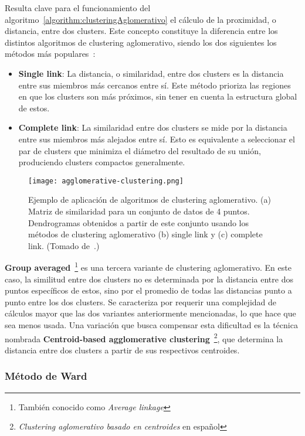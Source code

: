 Resulta clave para el funcionamiento del algoritmo~\ref{algorithm:clusteringAglomerativo} el cálculo de la proximidad, o distancia, entre dos clusters.
Este concepto constituye la diferencia entre los distintos algoritmos de clustering aglomerativo, siendo los dos siguientes los métodos más populares~\cite{Aggarawal13}:

\begin{itemize}
    \item \textbf{Single link}: La distancia, o similaridad, entre dos clusters es la distancia entre sus miembros más cercanos entre sí.
    Este método prioriza las regiones en que los clusters son más próximos, sin tener en cuenta la estructura global de estos.
    \item \textbf{Complete link}: La similaridad entre dos clusters se mide por la distancia entre sus miembros más alejados entre sí.
    Esto es equivalente a seleccionar el par de clusters que minimiza el diámetro del resultado de su unión, produciendo clusters compactos generalmente.
\end{itemize}

\begin{figure}[!h]
    \centering
    \texttt{[image: agglomerative-clustering.png]}
    \caption{Ejemplo de aplicación de algoritmos de clustering aglomerativo. (a) Matriz de similaridad para un conjunto de datos de 4 puntos.
    Dendrogramas obtenidos a partir de este conjunto usando los métodos de clustering aglomerativo (b) single link y (c) complete link. (Tomado de~\cite{Aggarawal13}.)}
\end{figure}

\textbf{Group averaged}~\footnote{También conocido como \textit{Average linkage}} es una tercera variante de clustering aglomerativo.
En este caso, la similitud entre dos clusters no es determinada por la distancia entre dos puntos específicos de estos, sino por el promedio de todas las distancias punto a punto entre los dos clusters.
Se caracteriza por requerir una complejidad de cálculos mayor que las dos variantes anteriormente mencionadas, lo que hace que sea menos usada.
Una variación que busca compensar esta dificultad es la técnica nombrada \textbf{Centroid-based agglomerative clustering}~\footnote{\textit{Clustering aglomerativo basado en centroides} en español}, que determina la distancia entre dos clusters a partir de sus respectivos centroides.

\subsubsection{Método de Ward}

